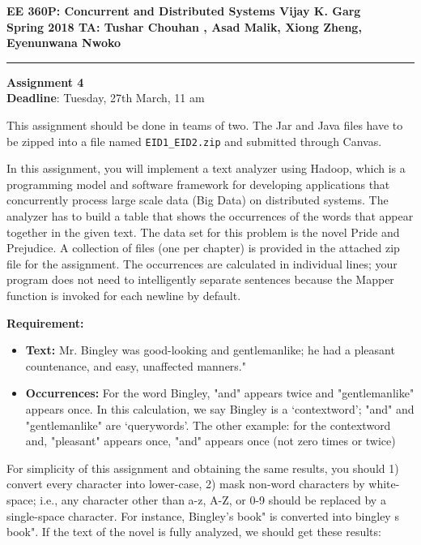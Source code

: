 \documentclass[11pt]{article}
\begin{document}
\begin{center}
{\bf EE 360P: Concurrent and Distributed Systems \hfill  Vijay K. Garg}\\
{\bf Spring 2018 \hfill TA: Tushar Chouhan , Asad Malik, Xiong Zheng, Eyenunwana Nwoko}\\
\noindent\rule{\textwidth}{0.4pt}
\end{center}

\begin{center}
{\bf Assignment 4}\\
{\bf Deadline}: Tuesday, 27th March, 11 am
\end{center}

This assignment should be done in teams of two. The Jar and Java files have to be zipped into a file named {\tt EID1\_EID2.zip} and submitted through Canvas.%

In this assignment, you will implement a text analyzer using Hadoop, which is a programming
model and software framework for developing applications that concurrently process large scale data
(Big Data) on distributed systems. The analyzer has to build a table that shows the occurrences of
the words that appear together in the given text. The data set for this problem is the novel Pride and
Prejudice. A collection of files (one per chapter) is provided in the attached zip file for the assignment.
The occurrences are calculated in individual lines; your program does not need to intelligently separate
sentences because the Mapper function is invoked for each newline by default.


{\bf Requirement:}
\begin{itemize}
\item  {\bf Text: } Mr. Bingley was good-looking and gentlemanlike; he had a pleasant countenance, and
easy, unaffected manners."



\item {\bf Occurrences:} For the word Bingley, "and" appears twice and "gentlemanlike" appears once.
In this calculation, we say Bingley is a `contextword'; "and" and "gentlemanlike" are `querywords'.
The other example: for the contextword and, "pleasant" appears once, "and" appears
once (not zero times or twice)
\end{itemize}
For simplicity of this assignment and obtaining the same results, you should 1) convert every
character into lower-case, 2) mask non-word characters by white-space; i.e., any character other than
a-z, A-Z, or 0-9 should be replaced by a single-space character. For instance, Bingley's book" is
converted into bingley s book". If the text of the novel is fully analyzed, we should get these results:
\end{document}
